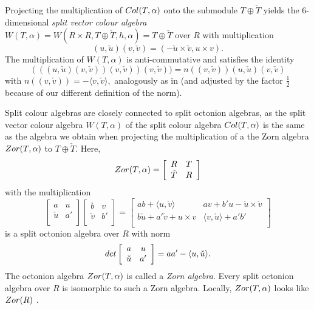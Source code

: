 \documentclass[10pt]{amsart}
\theoremstyle{plain}
\theoremstyle{definition}
\begin{document}
Projecting the multiplication of ${\rm Col}(T,\alpha)$ onto the submodule $T\oplus \check{T} $ yields the 6-dimensional \emph{split vector colour algebra} $W(T,\alpha)=W(R\times R,T\oplus \check{T},h,\alpha)=T\oplus \check{T}$ over $R$
 with multiplication
 $$(u,\check{u})( v,\check{v})=(-\check{u}\times \check{v}, u\times v).$$
 The multiplication of $W(T,\alpha)$ is anti-commutative and satisfies the identity
 $$(((u,\check{u}) ( v,\check{v})) ( v,\check{v}))( v,\check{v}))=
 n(( v,\check{v}))(u,\check{u}) ( v,\check{v})$$
 with $n(( v,\check{v}))= -\langle v,\check{v}\rangle,$
 analogously as in \cite{E1} (and adjusted by the factor $\frac{1}{2}$ because of our different definition of the norm).

Split colour algebras are closely connected to  split octonion algebras, as  the split vector colour algebra $W(T,\alpha)$ of the split colour algebra ${\rm Col}(T,\alpha)$ is the same as the algebra we obtain when projecting the multiplication of a the Zorn algebra ${\rm Zor}(T,\alpha)$ to $T\oplus \check{T}$. Here,
\[
{\rm Zor}(T,\alpha)=
\left [\begin {array}{cc}
 R & T\\
\check{T}  &  R \\
\end {array}\right ]
\]
with the multiplication
\[
\left [\begin {array}{cc}
 a & u\\
\check{u}  &  a' \\
\end {array}\right ]
\left [\begin {array}{cc}
 b & v\\
\check{v}  &  b' \\
\end {array}\right ]
=
\left [\begin {array}{cc}
 ab+\langle u,\check{v}\rangle & av+b'u-\check{u}\times \check{v}\\
b\check{u} +a'\check{v}+u\times v & \langle v,\check{u}\rangle+ a'b' \\
\end {array}\right ]
\]
is a split octonion algebra over $R$  with norm
\[
{\rm det}
\left [\begin {array}{cc}
 a & u\\
\check{u}  &  a' \\
\end {array}\right ]=
aa'-\langle u,\check{u}\rangle .
\]
The octonion algebra ${\rm Zor}(T,\alpha)$ is  called a {\it Zorn algebra}. Every split octonion algebra over $R$ is isomorphic to such a Zorn algebra. Locally, ${\rm Zor}(T,\alpha)$ looks like ${\rm Zor}(R)$
\cite[3.3, 3.4, 3.5]{P2}.
\end{document}
